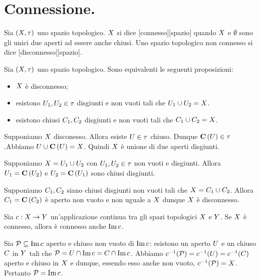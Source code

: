 \section{Connessione.}\label{Connessione}
\begin{Definition}
	Sia $(X,\tau)$ uno spazio topologico.
	$X$ si dice [connesso][spazio]
	quando $X$ e $\emptyset$ sono gli unici due
	aperti ad essere anche chiusi. Uno spazio topologico non connesso
	si dice [disconnesso][spazio].
\end{Definition}
\begin{Theorem}
	Sia $(X,\tau)$ uno spazio topologico.
	Sono equivalenti le seguenti proposizioni:
	\begin{itemize}
		\item $X$ \`e disconnesso;
		\item esistono $U_1, U_2 \in \tau$ disgiunti
		e non vuoti tali che $U_1 \cup U_2 =
		X$.
		\item esistono chiusi $C_1, C_2$ disgiunti e
		non vuoti tali che $C_1 \cup C_2 =
		X$.
	\end{itemize}
\end{Theorem}
\Proof Supponiamo $X$ disconesso. Allora esiste
$U \in \tau$ chiuso. Dunque $\mathbf{C} \left ( U \right ) \in \tau$.Abbiamo
 $U \cup \mathbf{C} \left ( U \right ) = X$.
Quindi $X$ \`e unione di due aperti disgiunti.
\par Supponiamo $X = U_1 \cup U_2$ con $U_1,
U_2  \in \tau$ non vuoti e disgiunti. Allora $U_1 =
\mathbf{C} \left ( U_2 \right )$ e $U_2 = \mathbf{C} \left ( U_1 \right )$ sono chiusi disgiunti.
\par Supponiamo $C_1, C_2$ siano chiusi disgiunti non vuoti
tali che $X = C_1 \cup C_2$. Allora $C_1
= \mathbf{C} \left ( C_2 \right )$ \`e aperto non vuoto e non uguale a
$X$ dunque $X$ \`e disconnesso. \EndProof
\begin{Theorem}
	Sia $c: X \rightarrow Y$ un'applicazione continua tra gli spazi topologici $X$ e $Y$. Se $X$ \`e connesso, allora \`e connesso anche $\operatorname{Im}{c}$.
\end{Theorem}
\Proof Sia $\mathcal{P} \subseteq \operatorname{Im}{c}$ aperto e chiuso non vuoto di $\operatorname{Im}{c}$: esistono un aperto $U$ e un chiuso $C$ in $Y$ tali che $\mathcal{P} = U \cap \operatorname{Im}{c} = C \cap \operatorname{Im}{c}$. Abbiamo $c^{-1}(\mathcal{P}) = c^{-1}(U) = c^{-1}(C)$ aperto e chiuso in $X$ e dunque, essendo esso anche non vuoto, $c^{-1}(\mathcal{P}) = X$. Pertanto $\mathcal{P} = \operatorname{Im}{c}$. \EndProof
